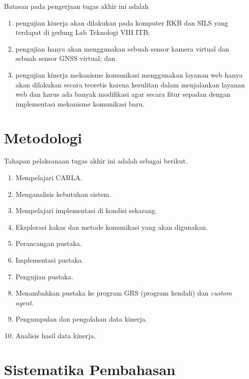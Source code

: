 Batasan pada pengerjaan tugas akhir ini adalah

\begin{enumerate}
	\item pengujian kinerja akan dilakukan pada komputer RKB dan SILS yang
	      terdapat di gedung Lab Teknologi VIII ITB;
	\item pengujian hanya akan menggunakan sebuah sensor kamera virtual dan
	      sebuah sensor GNSS virtual; dan
	\item pengujian kinerja mekanisme komunikasi menggunakan layanan web hanya akan
	      dilakukan secara teoretis karena kesulitan dalam menjalankan layanan web
	      dan harus ada banyak modifikasi agar secara fitur sepadan dengan
	      implementasi mekanisme komunikasi baru.
\end{enumerate}

\section{Metodologi}


Tahapan pelaksanaan tugas akhir ini adalah sebagai berikut.

\begin{enumerate}
	\item Mempelajari CARLA.
	\item Menganalisis kebutuhan sistem.
	\item Mempelajari implementasi di kondisi sekarang.
	\item Eksplorasi kakas dan metode komunikasi yang akan digunakan.
	\item Perancangan pustaka.
	\item Implementasi pustaka.
	\item Pengujian pustaka.
	\item Menambahkan pustaka ke program GRS (program kendali) dan
	      \textit{custom agent}.
	\item Pengumpulan dan pengolahan data kinerja.
	\item Analisis hasil data kinerja.
\end{enumerate}

\section{Sistematika Pembahasan}

